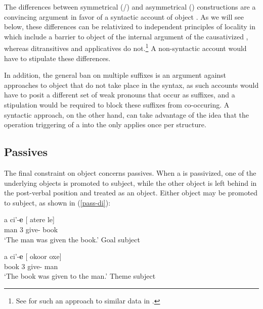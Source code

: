 \documentclass[output=paper,
modfonts
]{langscibook}
\begin{document}
\noindent The differences between symmetrical (/) and asymmetrical ()  constructions are a convincing argument in favor of a syntactic account of object . As we will see below, these differences can be relativized to independent principles of locality in which  include a barrier to object  of the internal argument of the causativized , whereas ditransitives and applicatives do not.\footnote{See \cite{Baker:2012} for such an approach to similar data in .} A non-syntactic account would have to stipulate these differences.

In addition, the general ban on multiple suffixes is an argument against approaches to object  that do not take place in the syntax, as such accounts would have to posit a different set of weak pronouns that occur as suffixes, and a stipulation would be required to block these suffixes from co-occuring. A syntactic approach, on the other hand, can take advantage of the idea that the operation triggering  of a  into the  only applies once per structure. 


\subsection{Passives}\label{sec:baier:3.3}

The final constraint on object  concerns passives. When a   is passivized, one of the underlying objects is promoted to subject, while the other object is left behind in the post-verbal position and treated as an object. Either object may be promoted to subject, as shown in (\ref{pass-di}):

\begin{exe}
\ex \label{pass-di}
\begin{xlista}
\ex {} a ci'-\textbf{e}  [ atere le] \\
{} man \Det{} 3 give-\Pass{} {} book \Det{} \\
\glt `The man was given the book.' \hfill {Goal subject}

\ex \gll [\xp{DP} atere le] a ci'-\textbf{e} [ okoor oxe] \\
{} book \Det{} 3 give-\Pass{} {} man \Det{} \\
\glt `The book was given to the man.' \hfill {Theme subject}
\end{xlista}
\end{exe}
\end{document}
